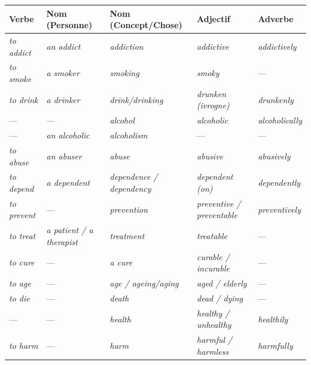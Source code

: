 \documentclass[11pt]{article}
\newcommand{\eng}[1]{\ifmmode\text{\textit{#1}}\else\begingroup\selectlanguage{english}\itshape #1\endgroup\fi}
\begin{document}
\begin{propriete}
\begin{center}
\begin{tabular}{|l|l|l|l|l|}
\hline
\rowcolor{popblueL} \textbf{Verbe} & \textbf{Nom (Personne)} & \textbf{Nom (Concept/Chose)} & \textbf{Adjectif} & \textbf{Adverbe} \\
\hline
\eng{to addict} & \eng{an addict} & \eng{addiction} & \eng{addictive} & \eng{addictively} \\
\hline
\eng{to smoke} & \eng{a smoker} & \eng{smoking} & \eng{smoky} & — \\
\hline
\eng{to drink} & \eng{a drinker} & \eng{drink/drinking} & \eng{drunken} (ivrogne) & \eng{drunkenly} \\
\hline
— & — & \eng{alcohol} & \eng{alcoholic} & \eng{alcoholically} \\
\hline
— & \eng{an alcoholic} & \eng{alcoholism} & — & — \\
\hline
\eng{to abuse} & \eng{an abuser} & \eng{abuse} & \eng{abusive} & \eng{abusively} \\
\hline
\eng{to depend} & \eng{a dependent} & \eng{dependence} / \eng{dependency} & \eng{dependent} (on) & \eng{dependently} \\
\hline
\eng{to prevent} & — & \eng{prevention} & \eng{preventive} / \eng{preventable} & \eng{preventively} \\
\hline
\eng{to treat} & \eng{a patient} / \eng{a therapist} & \eng{treatment} & \eng{treatable} & — \\
\hline
\eng{to cure} & — & \eng{a cure} & \eng{curable} / \eng{incurable} & — \\
\hline
\eng{to age} & — & \eng{age} / \eng{ageing/aging} & \eng{aged} / \eng{elderly} & — \\
\hline
\eng{to die} & — & \eng{death} & \eng{dead} / \eng{dying} & — \\
\hline
— & — & \eng{health} & \eng{healthy} / \eng{unhealthy} & \eng{healthily} \\
\hline
\eng{to harm} & — & \eng{harm} & \eng{harmful} / \eng{harmless} & \eng{harmfully} \\
\hline
\end{tabular}
\end{center}
\end{propriete}
\end{document}
